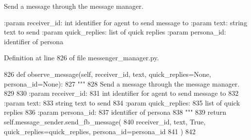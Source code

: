 \begin{DoxyVerb}Send a message through the message manager.

:param receiver_id:
    int identifier for agent to send message to
:param text:
    string text to send
:param quick_replies:
    list of quick replies
:param persona_id:
    identifier of persona
\end{DoxyVerb}
 

Definition at line 826 of file messenger\+\_\+manager.\+py.


\begin{DoxyCode}
826     \textcolor{keyword}{def }observe\_message(self, receiver\_id, text, quick\_replies=None, persona\_id=None):
827         \textcolor{stringliteral}{"""}
828 \textcolor{stringliteral}{        Send a message through the message manager.}
829 \textcolor{stringliteral}{}
830 \textcolor{stringliteral}{        :param receiver\_id:}
831 \textcolor{stringliteral}{            int identifier for agent to send message to}
832 \textcolor{stringliteral}{        :param text:}
833 \textcolor{stringliteral}{            string text to send}
834 \textcolor{stringliteral}{        :param quick\_replies:}
835 \textcolor{stringliteral}{            list of quick replies}
836 \textcolor{stringliteral}{        :param persona\_id:}
837 \textcolor{stringliteral}{            identifier of persona}
838 \textcolor{stringliteral}{        """}
839         \textcolor{keywordflow}{return} self.message\_sender.send\_fb\_message(
840             receiver\_id, text, \textcolor{keyword}{True}, quick\_replies=quick\_replies, persona\_id=persona\_id
841         )
842 
\end{DoxyCode}
\mbox{\label{classparlai_1_1chat__service_1_1services_1_1messenger_1_1messenger__manager_1_1MessengerManager_ad969bb72a7095bde4f48be0a403e9471}} 
